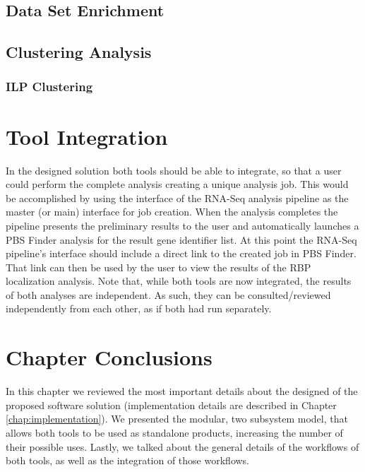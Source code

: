 \subsection{Data Set Enrichment}

\subsection{Clustering Analysis}

\subsubsection*{ILP Clustering}

\section{Tool Integration}


In the designed solution both tools should be able to integrate, so that a user
could perform the complete analysis creating a unique analysis job. This would
be accomplished by using the interface of the RNA-Seq analysis pipeline as the
master (or main) interface for job creation. When the analysis completes the
pipeline presents the preliminary results to the user and automatically launches
a PBS Finder analysis for the result gene identifier list. At this point the
RNA-Seq pipeline's interface should include a direct link to the created job in
PBS Finder. That link can then be used by the user to view the results of the
RBP localization analysis. Note that, while both tools are now integrated, the
results of both analyses are independent. As such, they can be
consulted/reviewed independently from each other, as if both had run separately.

\section{Chapter Conclusions}


In this chapter we reviewed the most important details about the designed of the
proposed software solution (implementation details are described in Chapter
\ref{chap:implementation}). We presented the modular, two subsystem model, that
allows both tools to be used as standalone products, increasing the number of
their possible uses. Lastly, we talked about the general details of the
workflows of both tools, as well as the integration of those workflows.
